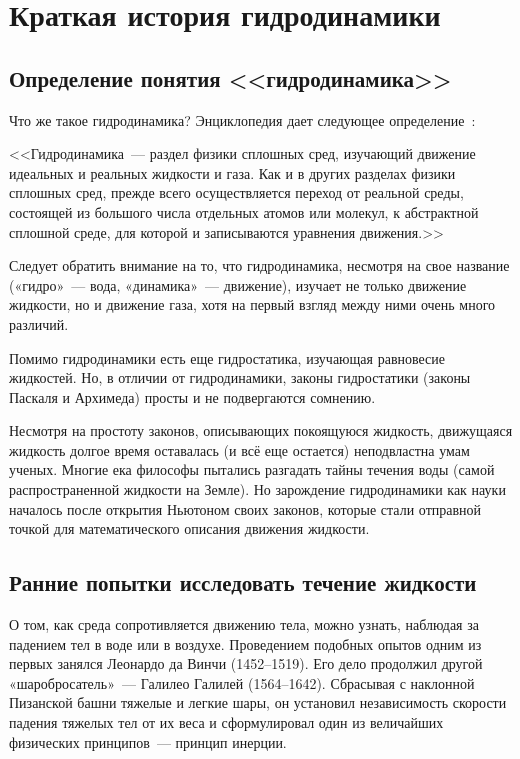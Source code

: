 
\section{Краткая история гидродинамики}

\subsection{Определение понятия <<гидродинамика>>}

Что же такое гидродинамика? Энциклопедия дает следующее определение~\cite{wiki}:

<<Гидродинамика~--- раздел физики сплошных сред, изучающий движение идеальных и реальных жидкости и газа.
Как и в других разделах физики сплошных сред, прежде всего осуществляется переход от реальной среды, 
состоящей из большого числа отдельных атомов или молекул, к абстрактной сплошной среде, для которой и 
записываются уравнения движения.>>

Следует обратить внимание на то, что гидродинамика, несмотря на свое название («гидро»~--- вода, 
«динамика»~--- движение), изучает не только движение жидкости, но и движение газа, хотя на первый 
взгляд между ними очень много различий.

Помимо гидродинамики есть еще гидростатика, изучающая равновесие жидкостей. Но, в отличии от 
гидродинамики, законы гидростатики (законы Паскаля и Архимеда) просты и не подвергаются сомнению.

Несмотря на простоту законов, описывающих покоящуюся жидкость, движущаяся жидкость долгое время 
оставалась (и всё еще остается) неподвластна умам ученых. Многие ека философы пытались разгадать 
тайны течения воды (самой распространенной жидкости на Земле). Но зарождение гидродинамики как науки 
началось после открытия Ньютоном своих законов, которые стали отправной точкой для математического 
описания движения жидкости.

\subsection{Ранние попытки исследовать течение жидкости}

О том, как среда сопротивляется движению тела, можно узнать, наблюдая за падением тел в воде или в воздухе. 
Проведением подобных опытов одним из первых занялся Леонардо да Винчи (1452--1519). 
Его дело продолжил другой «шаробросатель»~--- Галилео Галилей (1564--1642). 
Сбрасывая с наклонной Пизанской башни тяжелые и легкие шары, он установил независимость 
скорости падения тяжелых тел от их веса и сформулировал один из величайших физических принципов~--- принцип инерции.


